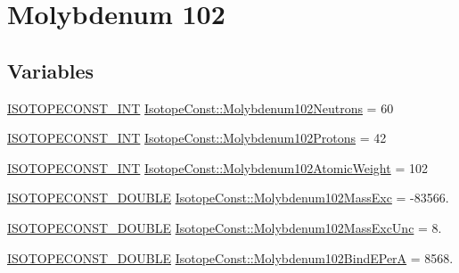 \hypertarget{group___isotope_const-_molybdenum-_mo102}{}\section{Molybdenum 102}
\label{group___isotope_const-_molybdenum-_mo102}
\subsection*{Variables}
\begin{DoxyCompactItemize}
\item 
\mbox{\hyperlink{group___isotope_const-_macros_ga5f18360b3e99483a35c32d789e62621c}{I\+S\+O\+T\+O\+P\+E\+C\+O\+N\+S\+T\+\_\+\+I\+NT}} \mbox{\hyperlink{group___isotope_const-_molybdenum-_mo102_ga62af6b4852d55358d2bacae578b3734c}{Isotope\+Const\+::\+Molybdenum102\+Neutrons}} = 60
\item 
\mbox{\hyperlink{group___isotope_const-_macros_ga5f18360b3e99483a35c32d789e62621c}{I\+S\+O\+T\+O\+P\+E\+C\+O\+N\+S\+T\+\_\+\+I\+NT}} \mbox{\hyperlink{group___isotope_const-_molybdenum-_mo102_ga5c40fa15b9a99c92bf0ebd8883c7631c}{Isotope\+Const\+::\+Molybdenum102\+Protons}} = 42
\item 
\mbox{\hyperlink{group___isotope_const-_macros_ga5f18360b3e99483a35c32d789e62621c}{I\+S\+O\+T\+O\+P\+E\+C\+O\+N\+S\+T\+\_\+\+I\+NT}} \mbox{\hyperlink{group___isotope_const-_molybdenum-_mo102_gaded69b0268bd739e93412ba1d31520a3}{Isotope\+Const\+::\+Molybdenum102\+Atomic\+Weight}} = 102
\item 
\mbox{\hyperlink{group___isotope_const-_macros_ga8f45a7272ce02c0b4c65c44636ed719a}{I\+S\+O\+T\+O\+P\+E\+C\+O\+N\+S\+T\+\_\+\+D\+O\+U\+B\+LE}} \mbox{\hyperlink{group___isotope_const-_molybdenum-_mo102_gae9765158bd4b079bf49ca44f7399b83b}{Isotope\+Const\+::\+Molybdenum102\+Mass\+Exc}} = -\/83566.
\item 
\mbox{\hyperlink{group___isotope_const-_macros_ga8f45a7272ce02c0b4c65c44636ed719a}{I\+S\+O\+T\+O\+P\+E\+C\+O\+N\+S\+T\+\_\+\+D\+O\+U\+B\+LE}} \mbox{\hyperlink{group___isotope_const-_molybdenum-_mo102_ga568b35cf7fc596d9b1699776778dfbe4}{Isotope\+Const\+::\+Molybdenum102\+Mass\+Exc\+Unc}} = 8.
\item 
\mbox{\hyperlink{group___isotope_const-_macros_ga8f45a7272ce02c0b4c65c44636ed719a}{I\+S\+O\+T\+O\+P\+E\+C\+O\+N\+S\+T\+\_\+\+D\+O\+U\+B\+LE}} \mbox{\hyperlink{group___isotope_const-_molybdenum-_mo102_ga04fb19c22c83e4f10a9e2b3ee17d1ce6}{Isotope\+Const\+::\+Molybdenum102\+Bind\+E\+PerA}} = 8568.
\item 

\end{DoxyCompactItemize}
